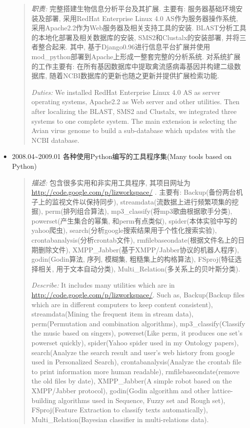 \documentclass[a4paper,10pt,english]{manual}
\begin{document}
\begin{itemize}
\begin{quote}
\emph{职责:} 完整搭建生物信息分析平台及其扩展. 主要有: 服务器基础环境安装及部署, 采用RedHat Enterprise Linux 4.0 AS作为服务器操作系统, 采用Apache2.2作为Web服务器及相关支持工具的安装. BLAST分析工具的本地化部署及相关数据库的安装, SMS2和Clustalx的安装部署, 并将三者整合起来. 其中, 基于Django0.96进行信息平台扩展并使用mod\_python部署到Apache上形成一整套完整的分析系统. 对系统扩展的工作主要有: 在所有基因数据库中提取禽流感病毒基因并构建二级数据库, 随着NCBI数据库的更新也随之更新并提供扩展检索功能.

\emph{Duties:} We installed RedHat Enterprise Linux 4.0 AS as server operating systems, Apache2.2 as Web server and other utilities. Then after localizing the BLAST, SMS2 and Clustalx, we integrated three systems to one complete system. The main extension is selecting the Avian virus genome to build a sub-database which updates with the NCBI database.
\end{quote}

\item {} 
2008.04\textasciitilde{}2009.01 各种使用Python编写的工具程序集(Many tools based on Python)
\begin{quote}

\emph{描述:} 包含很多实用和非实用工具程序, 其项目网址为 \href{http://code.google.com/p/lizworkspace/}{http://code.google.com/p/lizworkspace/} . 主要有: Backup(备份两台机子上的监视文件以保持同步), streamdata(流数据上进行频繁项集的挖掘), perm(排列组合算法), mp3\_classify(将mp3歌曲根据歌手分类), powerset(产生集合的幂集, 和perm有点类似), spider(本体实验中写的yahoo爬虫), search(分析google搜索结果用于个性化搜索实验), crontabanalysis(分析crontab文件), rmfilebaseondate(根据文件名上的日期删除文件), XMPP\_Jabber(基于XMPP/Jabber协议的机器人程序), godin(Godin算法, 序列, 模糊集, 粗糙集上的构格算法), FSproj(特征选择相关, 用于文本自动分类), Multi\_Relation(多关系上的贝叶斯分类).

\emph{Describe:} It includes many utilities which are in \href{http://code.google.com/p/lizworkspace/}{http://code.google.com/p/lizworkspace/}. Such as, Backup(Backup files which are in different computers to keep content consistent), streamdata(Mining the frequent item in stream data), perm(Permutation and combination algorithms), mp3\_classify(Classify the music based on singers), powerset(Like perm, it produces one set's powerset quickly), spider(Yahoo spider used in my Ontology papers), search(Analyze the search result and user's web history from google used in Personalized Search), crontabanalysis(Analyze the crontab file to print information more human readable), rmfilebaseondate(remove the old files by date), XMPP\_Jabber(A simple robot  based on the XMPP/Jabber protocol), godin(Godin algorithm and other lattice-building algorithms used in Sequence, Fuzzy set and Rough set), FSproj(Feature Extraction to classify texts automatically), Multi\_Relation(Bayesian classifier in multi-relations data).
\end{quote}

\end{itemize}
\end{document}
